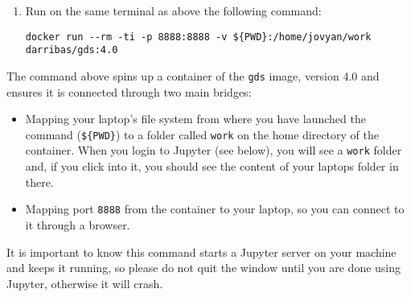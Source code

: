 \documentclass[
]{book}
\providecommand{\tightlist}{%
  \setlength{\itemsep}{0pt}\setlength{\parskip}{0pt}}
\begin{document}
\begin{enumerate}
\def\labelenumi{\arabic{enumi}.}
\item
  Run on the same terminal as above the following command:

\begin{verbatim}
docker run --rm -ti -p 8888:8888 -v ${PWD}:/home/jovyan/work darribas/gds:4.0
\end{verbatim}
\end{enumerate}

The command above spins up a container of the \texttt{gds} image, version 4.0 and
ensures it is connected through two main bridges:

\begin{itemize}
\tightlist
\item
  Mapping your laptop's file system from where you have launched the
  command (\texttt{\$\{PWD\}}) to a folder called \texttt{work} on the home directory of
  the container. When you login to Jupyter (see below), you will see a
  \texttt{work} folder and, if you click into it, you should see the content of
  your laptops folder in there.
\item
  Mapping port \texttt{8888} from the container to your laptop, so you can
  connect to it through a browser.
\end{itemize}

It is important to know this command starts a Jupyter server on your machine and keeps it running, so please do not quit the window until you are
done using Jupyter, otherwise it will crash.
\end{document}
